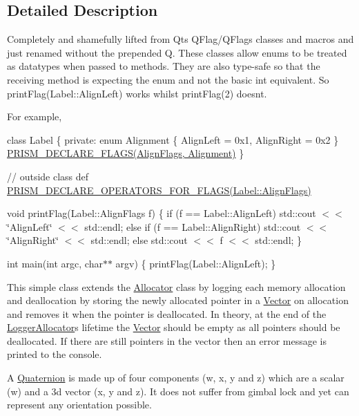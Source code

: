 \subsection{Detailed Description}
Completely and shamefully lifted from Qt\textquotesingle{}s Q\+Flag/\+Q\+Flags classes and macros and just renamed without the prepended \textquotesingle{}Q\textquotesingle{}. These classes allow enums to be treated as datatypes when passed to methods. They are also type-\/safe so that the receiving method is expecting the enum and not the basic int equivalent. So print\+Flag(\+Label\+::\+Align\+Left) works whilst print\+Flag(2) doesn\textquotesingle{}t.

For example,

class Label \{ private\+: enum Alignment \{ Align\+Left = 0x1, Align\+Right = 0x2 \} \hyperlink{_flags_8h_aa5aa2c9827ab949836e20999b9a068ec}{P\+R\+I\+S\+M\+\_\+\+D\+E\+C\+L\+A\+R\+E\+\_\+\+F\+L\+A\+G\+S(\+Align\+Flags, Alignment)} \}

// outside class def \hyperlink{_flags_8h_ae8aabb683a18b872a4449769b82e8e15}{P\+R\+I\+S\+M\+\_\+\+D\+E\+C\+L\+A\+R\+E\+\_\+\+O\+P\+E\+R\+A\+T\+O\+R\+S\+\_\+\+F\+O\+R\+\_\+\+F\+L\+A\+G\+S(\+Label\+::\+Align\+Flags)}

void print\+Flag(\+Label\+::\+Align\+Flags f) \{ if (f == Label\+::\+Align\+Left) std\+::cout $<$$<$ \char`\"{}\+Align\+Left\char`\"{} $<$$<$ std\+::endl; else if (f == Label\+::\+Align\+Right) std\+::cout $<$$<$ \char`\"{}\+Align\+Right\char`\"{} $<$$<$ std\+::endl; else std\+::cout $<$$<$ f $<$$<$ std\+::endl; \}

int main(int argc, char$\ast$$\ast$ argv) \{ print\+Flag(\+Label\+::\+Align\+Left); \}

This simple class extends the \hyperlink{classprism_1_1_allocator}{Allocator} class by logging each memory allocation and deallocation by storing the newly allocated pointer in a \hyperlink{classprism_1_1_vector}{Vector} on allocation and removes it when the pointer is deallocated. In theory, at the end of the \hyperlink{classprism_1_1_logger_allocator}{Logger\+Allocator}\textquotesingle{}s lifetime the \hyperlink{classprism_1_1_vector}{Vector} should be empty as all pointers should be deallocated. If there are still pointers in the vector then an error message is printed to the console.

A \hyperlink{classprism_1_1_quaternion}{Quaternion} is made up of four components (w, x, y and z) which are a scalar (w) and a 3d vector (x, y and z). It does not suffer from gimbal lock and yet can represent any orientation possible.

